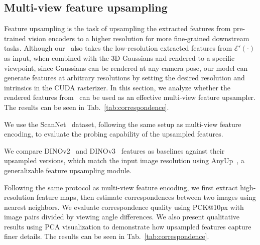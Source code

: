 \subsection{Multi-view feature upsampling}
Feature upsampling is the task of upsampling the extracted features from pre-trained vision encoders to a higher resolution for more fine-grained downstream tasks. Although our \oursF\ also takes the low-resolution extracted features from $\mathcal{E}'(\cdot)$ as input, when combined with the 3D Gaussians and rendered to a specific viewpoint, since Gaussians can be rendered at any camera pose, our model can generate features at arbitrary resolutions by setting the desired resolution and intrinsics in the CUDA rasterizer. In this section, we analyze whether the rendered features from \oursF\ can be used as an effective multi-view feature upsampler. The results can be seen in Tab.~\ref{tab:correspondence}.

We use the ScanNet~\cite{dai2017scannet} dataset, following the same setup as multi-view feature encoding, to evaluate the probing capability of the upsampled features.

We compare DINOv2~\cite{oquab2023dinov2} and DINOv3~\cite{simeoni2025dinov3} features as baselines against their upsampled versions, which match the input image resolution using AnyUp~\cite{wimmer2025anyup}, a generalizable feature upsampling module.

Following the same protocol as multi-view feature encoding, we first extract high-resolution feature maps, then estimate correspondences between two images using nearest neighbors. We evaluate correspondence quality using PCK@10px with image pairs divided by viewing angle differences. We also present qualitative results using PCA visualization to demonstrate how upsampled features capture finer details. The results can be seen in Tab.~\ref{tab:correspondence}.

\clearpage